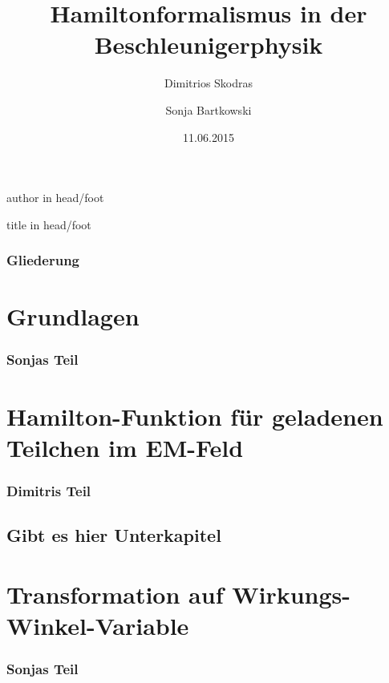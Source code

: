 \documentclass[hyperref={pdfpagelabels=false}]{beamer}
\title[Hamiltonformalismus]{Hamiltonformalismus in der Beschleunigerphysik}
\institute{Beschleunigerphysik I \& II\\
Technische Universit\"at Dortmund}
\author{Dimitrios Skodras \and Sonja Bartkowski}
\date{11.06.2015}
\begin{document}
{%
  \leavevmode%
 \begin{beamercolorbox}%
    [wd=.5\paperwidth,ht=2.5ex,dp=1.125ex,leftskip=.3cm,rightskip=.3cm]%
    {author in head/foot}%
    \hfill\insertshortauthor
  \end{beamercolorbox}%
  \begin{beamercolorbox}%
    [wd=.5\paperwidth,ht=2.5ex,dp=1.125ex,leftskip=.3cm ,rightskip=.3cm]%
    {title in head/foot}%
    \insertshorttitle\hfill\insertframenumber{}
  \end{beamercolorbox}%
}%

\captionsetup[figure]{font=small,skip=0pt}
\begin{frame}
\titlepage
\end{frame} 

\begin{frame}
\frametitle{Gliederung}
\tableofcontents
\end{frame} 


\section{Grundlagen}
 \begin{frame}
   \frametitle{Sonjas Teil}
   \pause
 \end{frame}
 

\section{Hamilton-Funktion für geladenen Teilchen im EM-Feld}
\begin{frame}
\frametitle{Dimitris Teil}
\tableofcontents[currentsection]
\end{frame}
\subsection{Gibt es hier Unterkapitel}
 

\section{Transformation auf Wirkungs-Winkel-Variable}
\begin{frame}
\frametitle{Sonjas Teil}
\tableofcontents[currentsection]
\end{frame}
\end{document}
